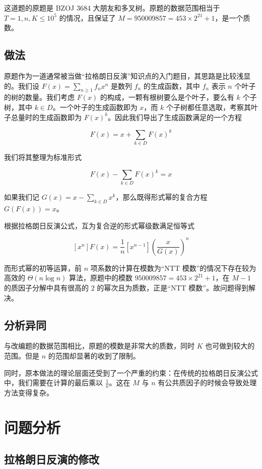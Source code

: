 \documentclass[12pt]{ctexart}
\begin{document}
这道题的原题是 BZOJ 3684 大朋友和多叉树。原题的数据范围相当于 $T = 1, n, K \le 10^5$ 的情况，且保证了 $M=950009857 = 453\times2^{21}+1$，是一个质数。

\subsection{做法}

原题作为一道通常被当做“拉格朗日反演”知识点的入门题目，其思路是比较浅显的。我们设 $F(x) = \sum_{n\ge 1} f_n x^n$ 是数列 $f_n$ 的生成函数，其中 $f_n$ 表示 $n$ 个叶子的树的数量。我们考虑 $F(x)$ 的构成，一颗有根树要么是个叶子，要么有 $k$ 个子树，其中 $k\in D$。一个叶子的生成函数即为 $x$，而 $k$ 个子树都任意选取，考察其叶子总量时的生成函数即为 $F(x)^k$。因此我们导出了生成函数满足的一个方程

$$
F(x)=x+\sum_{k\in D} F(x)^k
$$

我们将其整理为标准形式

$$
F(x) - \sum_{k\in D} F(x)^k=x
$$

如果我们记 $G(x) = x - \sum_{k\in D}x^k$，那么既得形式幂的复合方程 $G(F(x))=x$。

根据拉格朗日反演公式，互为复合逆的形式幂级数满足恒等式

$$
[x^n] F(x) = \frac 1n[x^{n-1}] \left(\frac{x}{G(x)}\right)^n
$$

而形式幂的初等运算，前 $n$ 项系数的计算在模数为“NTT 模数”的情况下存在较为高效的 $\Theta(n\log n)$ 算法，原题中的模数 $950009857 = 453\times2^{21}+1$，在 $M-1$ 的质因子分解中具有很高的 $2$ 的幂次且为质数，正是“NTT 模数”。故问题得到解决。

\subsection{分析异同}

与改编题的数据范围相比，原题的模数是非常大的质数，同时 $K$ 也可做到较大的范围。但是 $n$ 的范围却显著的收到了限制。

同时，原本做法的理论层面还受到了一个严重的约束：在传统的拉格朗日反演公式中，我们需要在计算的最后乘以 $\frac 1n$。这在 $M$ 与 $n$ 有公共质因子的时候会导致处理方法变得复杂。

\section{问题分析}

\subsection{拉格朗日反演的修改}
\end{document}
